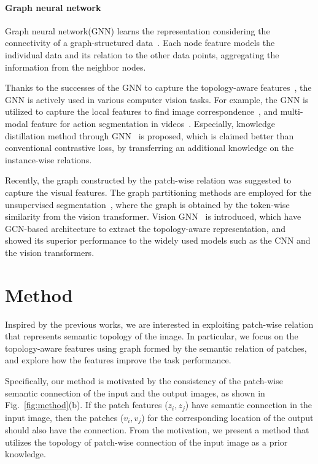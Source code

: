 \documentclass[letterpaper]{article} %
\begin{document}
\paragraph{Graph neural network}

Graph neural network(GNN) learns the representation considering the connectivity of a graph-structured data~\cite{gcn, tagcn}. Each node feature models the individual data and its relation to the other data points, aggregating the information from the neighbor nodes. 

Thanks to the successes of the GNN to capture the topology-aware features~\cite{lagraph, sep, structPool}, the GNN is actively used in various computer vision tasks.
For example, the GNN is utilized to capture the local features to find image correspondence~\cite{superGlue}, and multi-modal feature for action segmentation in videos~\cite{semantic2graph}. Especially, knowledge distillation method through GNN~\cite{hkd, gkd} is proposed, which is claimed better than conventional contrastive loss, by transferring an additional knowledge on the instance-wise relations.

Recently, the graph constructed by the patch-wise relation was suggested to capture the visual features. The graph partitioning methods are employed for the unsupervised segmentation~\cite{deepSpectral,tokenCut}, where the graph is obtained by the token-wise similarity from the vision transformer. Vision GNN~\cite{visionGNN} is introduced, which have GCN-based architecture to extract the topology-aware representation, and showed its superior performance to the widely used models such as the CNN and the vision transformers.




\section{Method}

Inspired by the previous works, we are interested in exploiting patch-wise relation that represents semantic topology of the image. 
In particular, we focus on the topology-aware features using graph formed by the semantic relation of patches, and explore how the features improve the task performance. 

Specifically, our method is motivated by the consistency of the patch-wise semantic connection of the input and the output images, as shown in Fig.~\ref{fig:method}(b). If the patch features ($z_i, z_j$) have semantic connection in the input image, then the patches ($v_i, v_j$) for the corresponding location of the output should also have the connection. From the motivation, we present a method that  utilizes the topology of patch-wise connection of the input image as a prior knowledge. 
\end{document}
